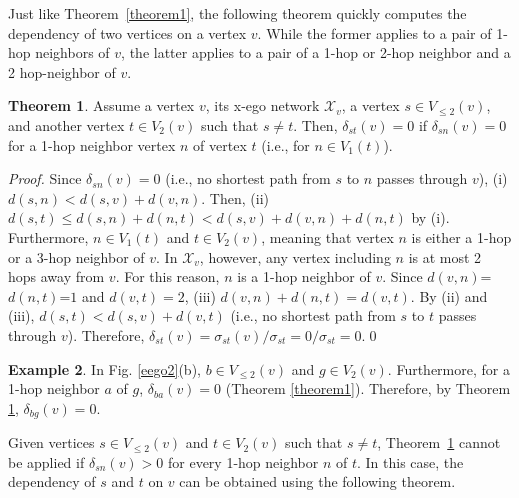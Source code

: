 \documentclass[preprint,12pt,authoryear]{elsarticle}
\newcommand{\D}[3]{\delta_{{#1}{#2}}({#3})}
\newcommand{\V}[2]{V_{#2}({#1})}
\newcommand{\LV}[2]{V_{\le #2}({#1})}
\newcommand{\XN}[1]{\mathcal{X}_{{#1}}}
\theoremstyle{definition}
\newtheorem{theorem}{Theorem}[section]
\newtheorem{example}[theorem]{Example}
\begin{document}
Just like Theorem~\ref{theorem1}, the following theorem quickly computes the dependency of two vertices on a vertex $v$.
While the former applies to a pair of 1-hop neighbors of $v$, the latter applies to a pair of a 1-hop or 2-hop neighbor and a 2 hop-neighbor of $v$.

\begin{theorem}
\label{theorem3} 
Assume a vertex $v$, its x-ego network $\XN{v}$, a vertex $s \in \LV{v}{2}$, and another vertex $t \in \V{v}{2}$ such that $s \ne t$.
Then, $\D{s}{t}{v} = 0$ if $\D{s}{n}{v} = 0$ for a 1-hop neighbor vertex $n$ of vertex $t$ (i.e., for $n \in \V{t}{1}$).
\begin{proof}
Since $\D{s}{n}{v} = 0$ (i.e., no shortest path from $s$ to $n$ passes through $v$), (i) $d(s, n) < d(s, v) +d(v, n)$.
Then, (ii) $d(s, t) \le d(s, n) + d(n, t) < d(s, v) + d(v, n) + d(n, t)$ by (i).
Furthermore, $n \in \V{t}{1}$ and $t \in \V{v}{2}$, meaning that vertex $n$ is either a 1-hop or a 3-hop neighbor of $v$.
In $\XN{v}$, however, any vertex including $n$ is at most 2 hops away from $v$.
For this reason, $n$ is a 1-hop neighbor of $v$.
Since $d(v, n)$=$d(n, t)$=$1$ and $d(v, t)=2$, (iii) $d(v, n) + d(n, t) = d(v, t)$. 
By (ii) and (iii), $d(s, t) < d(s, v) +d(v, t)$ (i.e., no shortest path from $s$ to $t$ passes through $v$).
Therefore, $\D{s}{t}{v}  = \sigma_{st}(v)/\sigma_{st} = 0/\sigma_{st} = 0$.\hfill\qed
\end{proof}
\end{theorem}

\begin{example}
In Fig. \ref{eego2}(b), $b \in \LV{v}{2}$ and $g \in \V{v}{2}$. 
Furthermore, for a 1-hop neighbor $a$ of $g$, $\D{b}{a}{v}=0$ (Theorem \ref{theorem1}).
Therefore, by Theorem \ref{theorem3}, $\D{b}{g}{v}=0$.
\end{example}

Given vertices $s \in \LV{v}{2}$ and $t \in \V{v}{2}$ such that $s \ne t$, Theorem~\ref{theorem3} cannot be applied if $\D{s}{n}{v} > 0$ for every 1-hop neighbor $n$ of $t$.
In this case, the dependency of $s$ and $t$ on $v$ can be obtained using the following theorem.
\end{document}
